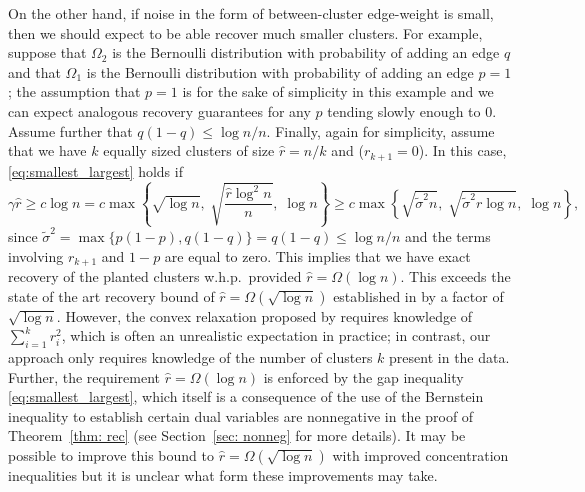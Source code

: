 \documentclass[twoside,11pt]{article}
\newcommand{\0}{\bs{0}}
\newcommand{\bra}[1]{\ensuremath{\left\{ #1 \right\}}} %
\newcommand{\ra}{\rightarrow}
\begin{document}
{%

On the other hand, if noise in the form of between-cluster
edge-weight is small, then we
should expect to be able recover
much smaller clusters.
For example, suppose that \(\Omega_2\) is the Bernoulli distribution with probability of adding an edge \(q\) and that \(\Omega_1\) is the Bernoulli distribution with probability of adding an edge \(p=1\); the assumption that \(p=1\) is for the sake of simplicity in this example and we can expect analogous recovery guarantees for
any \(p\) tending slowly enough to \(0\).
Assume further that
\(
q (1-q)  \le {\log n }/{n}.
\)
Finally, again for simplicity, assume that we have \(k\) equally sized clusters of size \(\hat r = n/k\)
and  (\(r_{k+1} = 0\)).
In this case, \eqref{eq:smallest_largest}
holds if
$$
\gamma \hat r \ge c \log n = c \max \bra{\sqrt{\log n},\; \sqrt{\frac{ \hat r \log^2n}{n}},\;\log n}
\ge c \max \bra{\sqrt{\tilde\sigma^2 n}, \; \sqrt{\tilde\sigma^2 r \log n},\; \log n},
$$
since $\tilde \sigma^2  = \max\{p(1-p), q(1-q)\} = q(1-q) \le \log n / n$
and the terms involving \(r_{k+1}\) and \(1-p\) are equal to zero.
This implies that we have exact recovery of the planted clusters
w.h.p.~provided $\hat r =\Omega(\log n)$. This exceeds the
state of the art recovery bound
of $\hat r = \Omega(\sqrt{\log n})$ established in \cite{jalali2015relative}
by a factor of $\sqrt{\log n}$.
However, the convex relaxation proposed by
\cite{jalali2015relative} requires knowledge
of $\sum_{i=1}^k r_i^2$, which is often an unrealistic
expectation in practice;
in contrast, our approach only requires knowledge
of the number of clusters $k$ present in the data.
Further,  the requirement $\hat r = \Omega(\log n)$
is enforced by the gap inequality \eqref{eq:smallest_largest},
which itself is a consequence of the use of the Bernstein inequality
to establish certain dual variables are nonnegative
in the proof of Theorem~\ref{thm: rec} (see Section~\ref{sec: nonneg}
for more details). It may be possible to improve this bound
to $\hat r = \Omega(\sqrt{\log n})$ with improved concentration
inequalities
 but it is unclear
what form these improvements may take.


}
\end{document}
